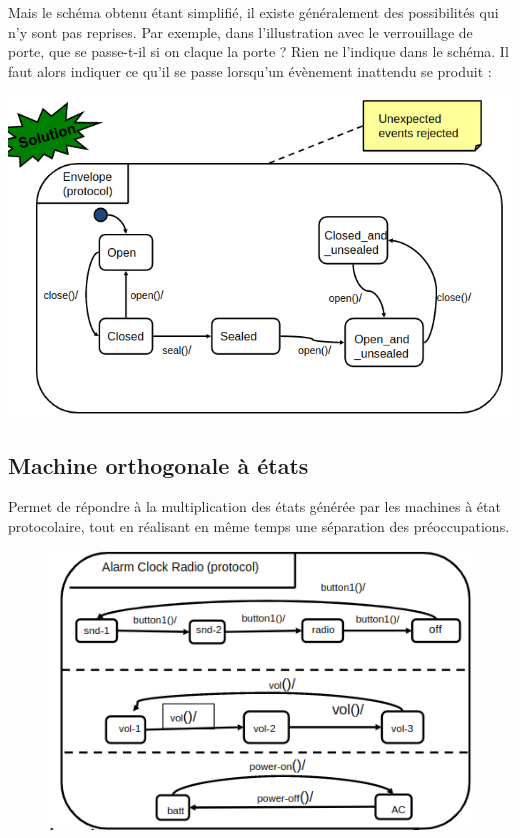 \documentclass[../Syllabus.tex]{subfiles}
\begin{document}
Mais le schéma obtenu étant simplifié, il existe généralement des possibilités qui n'y sont pas reprises. Par exemple, dans l'illustration avec le verrouillage de porte, que se passe-t-il si on claque la porte ? Rien ne l'indique dans le schéma. Il faut alors indiquer ce qu'il se passe lorsqu'un évènement inattendu se produit :

\begin{center}
    \includegraphics[scale=0.35]{img/exempleUnexpectedEvent.png}    
\end{center}

\subsection{Machine orthogonale à états}

Permet de répondre à la multiplication des états générée par les machines à état protocolaire, tout en réalisant en même temps une séparation des préoccupations.

\begin{figure}
    \includegraphics[scale=0.35]{img/exempleOrthogonalMachine.png}
\end{figure}
\end{document}
